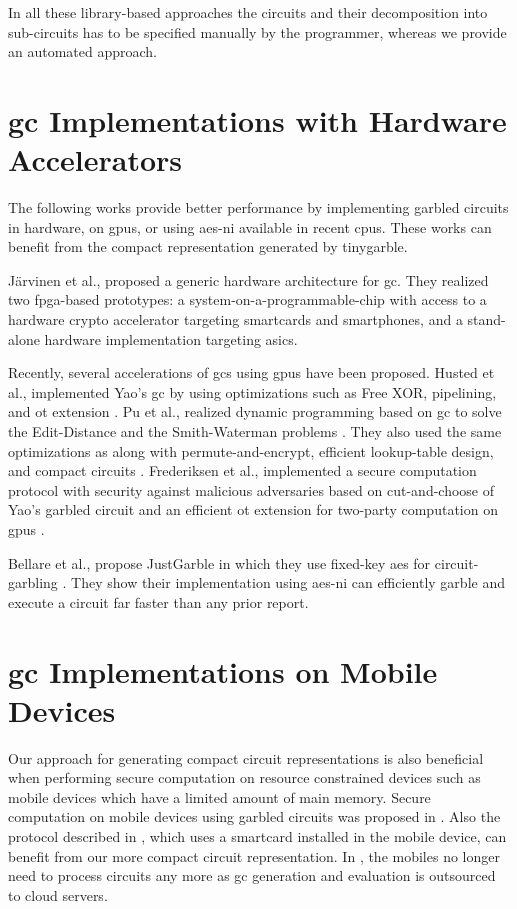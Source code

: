 In all these library-based approaches the circuits and their decomposition into sub-circuits has to be specified manually by the programmer, whereas we provide an automated approach.

\section{\acrshort{gc} Implementations with Hardware Accelerators}
The following works provide better performance by implementing garbled circuits in hardware, on \acrshort{gpu}s, or using \acrshort{aes-ni} available in recent \acrshort{cpu}s.
These works can benefit from the compact representation generated by \gls{tinygarble}.

J\"arvinen et al., \cite{jarvinen2010garbled} proposed a generic hardware architecture for \acrshort{gc}.
They realized two \acrshort{fpga}-based prototypes: a system-on-a-programmable-chip with access to a hardware crypto accelerator targeting smartcards and smartphones, and a stand-alone hardware implementation targeting \acrshort{asic}s.

Recently, several accelerations of \acrshort{gc}s using \acrshort{gpu}s have been proposed.
Husted et al., implemented Yao's \acrshort{gc} by using optimizations such as Free XOR, pipelining, and \acrshort{ot} extension \cite{husted2013gpu}.
Pu et al., realized dynamic programming based on \acrshort{gc} to solve the Edit-Distance and the Smith-Waterman problems \cite{pu2013computing}.
They also used the same optimizations as \cite{husted2013gpu} along with permute-and-encrypt, efficient lookup-table design, and compact circuits \cite{pu2013computing}.
Frederiksen et al., implemented a secure computation protocol with security against malicious adversaries based on cut-and-choose of Yao's garbled circuit and an efficient \acrshort{ot} extension for two-party computation on \acrshort{gpu}s \cite{frederiksen2013fast}.

Bellare et al., propose JustGarble in which they use fixed-key \acrshort{aes} for circuit-garbling \cite{bellare2013efficient}.
They show their implementation using \acrshort{aes-ni} can efficiently garble and execute a circuit far faster than any prior report.

\section{\acrshort{gc} Implementations on Mobile Devices}
Our approach for generating compact circuit representations is also beneficial when performing secure computation on resource constrained devices such as mobile devices which have a limited amount of main memory.
Secure computation on mobile devices using garbled circuits was proposed in \cite{huang2011privacy}.
Also the protocol described in \cite{demmler2014ad}, which uses a smartcard installed in the mobile device, can benefit from our more compact circuit representation.
In \cite{carter2016secure, carter2014whitewash}, the mobiles no longer need to process circuits any more as \acrshort{gc} generation and evaluation is outsourced to cloud servers.


